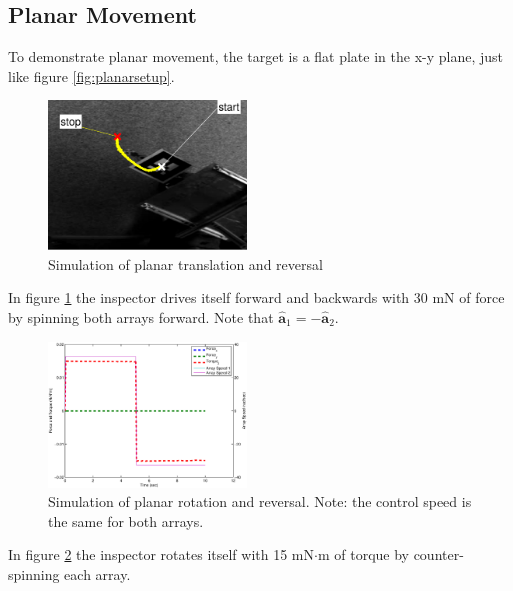 \documentclass[letterpaper, 10 pt, conference]{ieeeconf}  %
\begin{document}
\subsection{Planar Movement}\label{sec:planar_movement_sim}
To demonstrate planar movement, the target is a flat plate in the x-y plane, just like figure \ref{fig:planarsetup}. 
  
     \begin{figure}[thpb]
      	\centering
  		\includegraphics[width = 0.47\textwidth]{figures/planar_translation.eps}
      		\caption{Simulation of planar translation and reversal}
      		\label{fig:planar_translation_sim}
   \end{figure}
   
In figure \ref{fig:planar_translation_sim} the inspector drives itself forward and backwards with 30 mN of force by spinning both arrays forward. Note that $\hat{\textbf{a}}_1 = -\hat{\textbf{a}}_2$.  

     \begin{figure}[thpb]
      \centering
      \includegraphics[width = 0.47\textwidth]{figures/planar_rotations.eps}
      \caption{Simulation of planar rotation and reversal. Note: the control speed is the same for both arrays.}
      \label{fig:planar_rotation_sim}
   \end{figure}
   
In figure \ref{fig:planar_rotation_sim} the inspector rotates itself with 15 mN$\cdot$m of torque by counter-spinning each array. 
\end{document}
